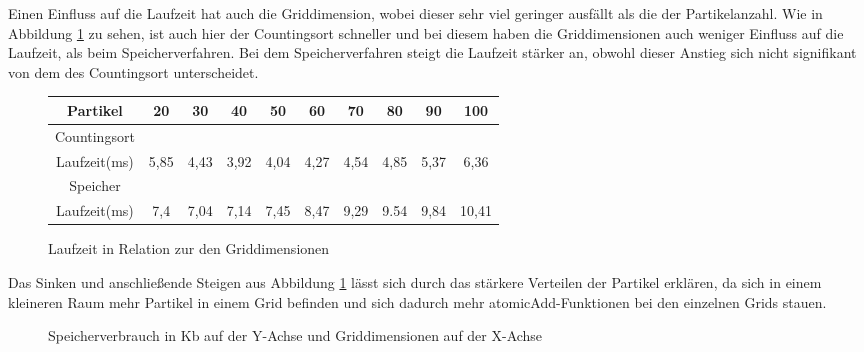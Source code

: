 \documentclass[intern,palatino]{cgBA}
\begin{document}
Einen Einfluss auf die Laufzeit hat auch die Griddimension, wobei dieser sehr viel geringer ausfällt als die der Partikelanzahl. Wie in Abbildung \ref{tab:Grid} zu sehen, ist auch hier der Countingsort schneller und bei diesem haben die Griddimensionen auch weniger Einfluss auf die Laufzeit, als beim Speicherverfahren. Bei dem Speicherverfahren steigt die Laufzeit stärker an, obwohl dieser Anstieg sich nicht signifikant von dem des Countingsort unterscheidet.

\begin{figure}[H]
	\centering
	\begin{tabular}{ | c || c | c | c | c | c | c | c | c | c |}
		\hline
		Partikel			&  20 & 30 & 40 & 50 & 60 & 70 & 80 & 90 & 100	\\ \hline
		Countingsort														\\ \hline
		Laufzeit(ms)		&   5,85 &  4,43 &  3,92 &  4,04 &  4,27 &  4,54 &  4,85 &  5,37 &	6,36	 	\\ \hline
		
		Speicher															\\ \hline
		Laufzeit(ms)		&   7,4 &  7,04 &  7,14 &  7,45 &  8,47 &  9,29 &  9.54 &  9,84 & 10,41	\\
		\hline
	\end{tabular}
	\caption{Laufzeit in Relation zur den Griddimensionen}
	\label{tab:Grid}
\end{figure}

Das Sinken und anschließende Steigen aus Abbildung \ref{tab:Grid} lässt sich durch das stärkere Verteilen der Partikel erklären, da sich in einem kleineren Raum mehr Partikel in einem Grid befinden und sich dadurch mehr atomicAdd-Funktionen bei den einzelnen Grids stauen.

\begin{figure}[H]
	\centering
	\caption{Speicherverbrauch in Kb auf der Y-Achse und Griddimensionen auf der X-Achse }
	\label{dia:speicher}
\end{figure}
\end{document}

